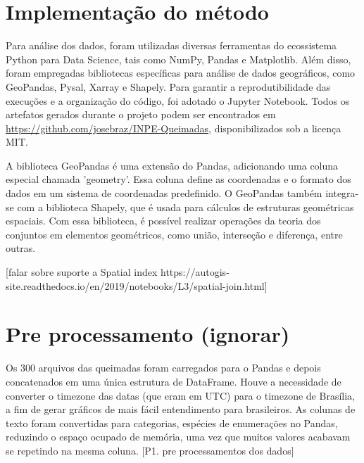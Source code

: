 \documentclass[cic,tc]{iiufrgs}
\begin{document}
\section{Implementação do método}

Para análise dos dados, foram utilizadas diversas ferramentas do ecossistema Python para Data Science, tais como NumPy, Pandas e Matplotlib. Além disso, foram empregadas bibliotecas específicas para análise de dados geográficos, como GeoPandas, Pysal, Xarray e Shapely. Para garantir a reprodutibilidade das execuções e a organização do código, foi adotado o Jupyter Notebook. Todos os artefatos gerados durante o projeto podem ser encontrados em \url{https://github.com/josebraz/INPE-Queimadas}, disponibilizados sob a licença MIT. \par

A biblioteca GeoPandas é uma extensão do Pandas, adicionando uma coluna especial chamada 'geometry'. Essa coluna define as coordenadas e o formato dos dados em um sistema de coordenadas predefinido. O GeoPandas também integra-se com a biblioteca Shapely, que é usada para cálculos de estruturas geométricas espaciais. Com essa biblioteca, é possível realizar operações da teoria dos conjuntos em elementos geométricos, como união, interseção e diferença, entre outras. \par

[falar sobre suporte a Spatial index https://autogis-site.readthedocs.io/en/2019/notebooks/L3/spatial-join.html] \par

\section{Pre processamento (ignorar)}

Os 300 arquivos das queimadas foram carregados para o Pandas e depois concatenados
em uma única estrutura de DataFrame. Houve a necessidade de converter o timezone 
das datas (que eram em UTC) para o timezone de Brasília, a fim de gerar gráficos 
de mais fácil entendimento para brasileiros. As colunas de texto foram convertidas 
para categorias, espécies de enumerações no Pandas, reduzindo o espaço ocupado 
de memória, uma vez que muitos valores acabavam se repetindo na mesma coluna. 
[P1. pre processamentos dos dados]\par
\end{document}
